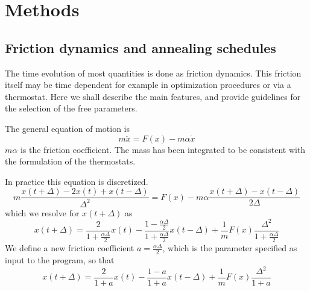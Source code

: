 \documentclass[final,12pt,makeidx,DIV=calc]{article}
\begin{document}
{{{{{{%
\newpage
\section{Methods}
\label{methods}
\subsection{Friction dynamics and annealing schedules}

The time evolution of most quantities is done as friction dynamics.
This friction itself may be time dependent for example in optimization
procedures or via a thermostat. Here we shall describe the main
features, and provide guidelines for the selection of the free
parameters.

The general equation of motion is 
\begin{displaymath}
m\ddot{x}=F(x)-m\alpha\dot{x}
\end{displaymath}
$m\alpha$ is the friction coefficient. The mass has been integrated to
be consistent with the formulation of the thermostats.

In practice this equation is discretized.
\begin{displaymath}
m\frac{x(t+\Delta)-2x(t)+x(t-\Delta)}{\Delta^2}
=F(x)-m\alpha\frac{x(t+\Delta)-x(t-\Delta)}{2\Delta}
\end{displaymath}
which we resolve for $x(t+\Delta)$ as
\begin{displaymath}
x(t+\Delta)=
\frac{2}{1+\frac{\alpha\Delta}{2}}x(t)
-\frac{1-\frac{\alpha\Delta}{2}}{1+\frac{\alpha\Delta}{2}}x(t-\Delta)
+\frac{1}{m}F(x)\frac{\Delta^2}{1+\frac{\alpha\Delta}{2}}
\end{displaymath}
We define a new friction coefficient $a=\frac{\alpha\Delta}{2}$, which is the
parameter specified as input to the program, so that
\begin{displaymath}
x(t+\Delta)=\frac{2}{1+a}x(t)-\frac{1-a}{1+a}x(t-\Delta)
+\frac{1}{m}F(x)\frac{\Delta^2}{1+a}
\end{displaymath}

}}}}}}
\end{document}
